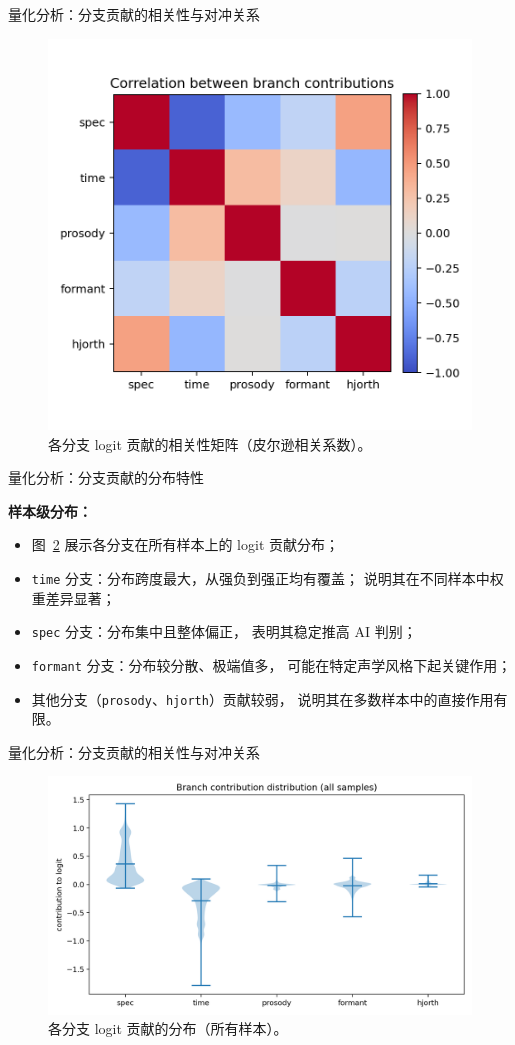 \documentclass[aspectratio=169]{beamer}
\begin{document}
\begin{frame}{量化分析：分支贡献的相关性与对冲关系}
\begin{figure}
  \centering
  \includegraphics[width=0.5\linewidth]{images_in_paper/contrib_correlation.png}
  \caption{各分支 logit 贡献的相关性矩阵（皮尔逊相关系数）。}
  \label{fig:contrib_corr}
\end{figure}

\end{frame}


\begin{frame}{量化分析：分支贡献的分布特性}

\textbf{样本级分布：}
\begin{itemize}
  \item 图~\ref{fig:contrib_violin} 展示各分支在所有样本上的 logit 贡献分布；
  \item \texttt{time} 分支：分布跨度最大，从强负到强正均有覆盖；
        说明其在不同样本中权重差异显著；
  \item \texttt{spec} 分支：分布集中且整体偏正，
        表明其稳定推高 AI 判别；
  \item \texttt{formant} 分支：分布较分散、极端值多，
        可能在特定声学风格下起关键作用；
  \item 其他分支（\texttt{prosody}、\texttt{hjorth}）贡献较弱，
        说明其在多数样本中的直接作用有限。
\end{itemize}

\end{frame}

\begin{frame}{量化分析：分支贡献的相关性与对冲关系}
\vspace{0.6em}
\begin{figure}
  \centering
  \includegraphics[width=0.75\linewidth]{images_in_paper/contrib_violin_all.png}
  \caption{各分支 logit 贡献的分布（所有样本）。}
  \label{fig:contrib_violin}
\end{figure}

\end{frame}
\end{document}
